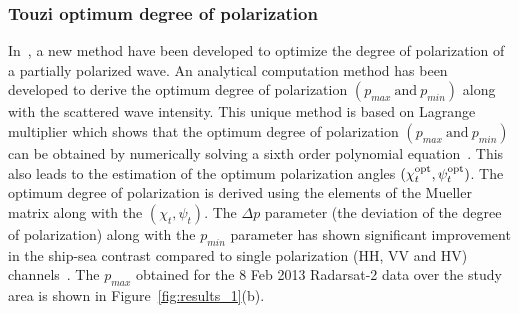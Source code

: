 \subsubsection{Touzi optimum degree of polarization}
In~\cite{touzi1992polarimetric}, a new method have been developed to optimize the degree of polarization of a partially polarized wave. An analytical computation method has been developed to derive the optimum degree of polarization $(p_{max}~\mbox{and}~p_{min})$ along with the scattered wave intensity. This unique method is based on Lagrange multiplier which shows that the optimum degree of polarization $(p_{max}~\mbox{and}~p_{min})$ can be obtained by numerically solving a sixth order polynomial equation~\citep{touzi1992polarimetric}. This also leads to the estimation of the optimum polarization angles $(\chi_{t}^{\mbox{\scriptsize opt}},\psi_{t}^{\mbox{\scriptsize opt}})$. The optimum degree of polarization is derived using the elements of the Mueller matrix along with the $(\chi_{t},\psi_{t})$. The $\Delta p$ parameter (the deviation of the degree of polarization) along with the $p_{min}$ parameter has shown significant improvement in the ship-sea contrast compared to single polarization (HH, VV and HV) channels~\citep{Touzi2015}. The $p_{max}$ obtained for the 8 Feb 2013 Radarsat-2 data over the study area is shown in Figure~\ref{fig:results_1}(b).

